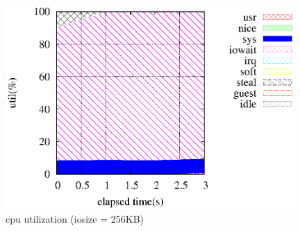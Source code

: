 \documentclass[11pt,a4paper]{jsarticle}
\begin{document}
\begin{figure}[thbp]
 \begin{center}
  \includegraphics[width=110mm]{md0_io262144_thr1core8.eps}
 \end{center}
 \caption{cpu utilization (iosize = 256KB)}
 \label{fig:cpuutil256}
\end{figure}
\end{document}
